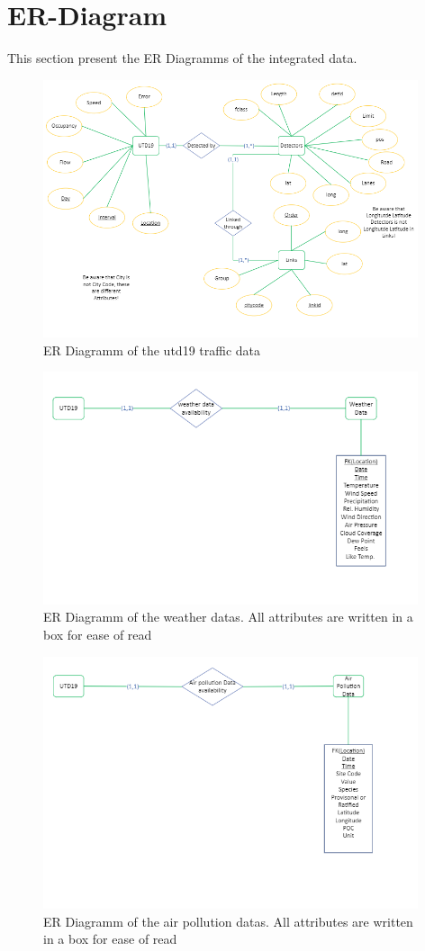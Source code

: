 \documentclass{article}
\begin{document}
\section{ER-Diagram}

This section present the ER Diagramms of the integrated data.
\begin{figure}[H]
\centering
\includegraphics[width=11cm]{first.png}
\caption{ER Diagramm of the utd19 traffic data}
\end{figure}

\begin{figure}[H]
\centering
\includegraphics[width=11cm]{second.png}
\caption{ER Diagramm of the weather datas. All attributes are written in a box for ease of read}
\end{figure}

\begin{figure}[H]
\centering
\includegraphics[width=11cm]{third.png}
\caption{ER Diagramm of the air pollution datas. All attributes are written in a box for ease of read}
\end{figure}
\end{document}
